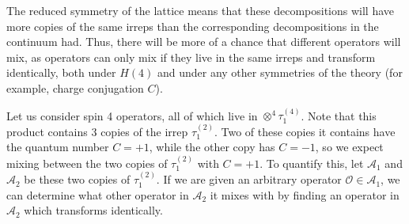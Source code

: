 \documentclass[11pt, oneside]{article}   	%
\theoremstyle{definition}
\begin{document}
The reduced symmetry of the lattice means that these decompositions will have more copies of the same irreps than 
the corresponding decompositions in the continuum had. Thus, there will be more of a chance that different 
operators will mix, as operators can only mix if they live in the same irreps and transform identically, both under 
$H(4)$ and under any other symmetries of the theory (for example, charge conjugation $C$). 

Let us consider spin 4 operators, all of which live in $\otimes^4\tau_1^{(4)}$. Note that this product contains 3 
copies of the irrep $\tau_1^{(2)}$. Two of these copies it contains have the quantum number $C = +1$, while the other 
copy has $C = -1$, so we expect mixing between the two copies of $\tau_1^{(2)}$ with $C = +1$. To 
quantify this, let $\mathcal A_1$ and $\mathcal A_2$ be these two copies of $\tau_1^{(2)}$. If we are given an arbitrary 
operator $\mathcal O\in\mathcal A_1$, we can determine what other operator in $\mathcal A_2$ it mixes with by finding 
an operator in $\mathcal A_2$ which transforms identically. 
\end{document}
